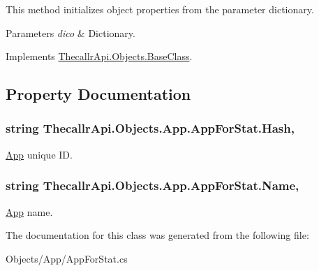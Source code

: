 This method initializes object properties from the parameter dictionary. 


\begin{DoxyParams}{Parameters}
{\em dico} & Dictionary.\\
\hline
\end{DoxyParams}


Implements \hyperlink{class_thecallr_api_1_1_objects_1_1_base_class_a77680f2cb89665fe65039581c7d907d2}{Thecallr\+Api.\+Objects.\+Base\+Class}.



\subsection{Property Documentation}
\hypertarget{class_thecallr_api_1_1_objects_1_1_app_1_1_app_for_stat_a6e538c1ad356e0bc657287492938e7cf}{
\subsubsection[{Hash}]{\setlength{\rightskip}{0pt plus 5cm}string Thecallr\+Api.\+Objects.\+App.\+App\+For\+Stat.\+Hash\hspace{0.3cm}{\ttfamily [get]}, {\ttfamily [set]}}}\label{class_thecallr_api_1_1_objects_1_1_app_1_1_app_for_stat_a6e538c1ad356e0bc657287492938e7cf}


\hyperlink{class_thecallr_api_1_1_objects_1_1_app_1_1_app}{App} unique I\+D. 

\hypertarget{class_thecallr_api_1_1_objects_1_1_app_1_1_app_for_stat_a7b83f0d49dfaf1053ef148fe699d0709}{
\subsubsection[{Name}]{\setlength{\rightskip}{0pt plus 5cm}string Thecallr\+Api.\+Objects.\+App.\+App\+For\+Stat.\+Name\hspace{0.3cm}{\ttfamily [get]}, {\ttfamily [set]}}}\label{class_thecallr_api_1_1_objects_1_1_app_1_1_app_for_stat_a7b83f0d49dfaf1053ef148fe699d0709}


\hyperlink{class_thecallr_api_1_1_objects_1_1_app_1_1_app}{App} name. 



The documentation for this class was generated from the following file\+:\begin{DoxyCompactItemize}
\item 
Objects/\+App/App\+For\+Stat.\+cs\end{DoxyCompactItemize}
